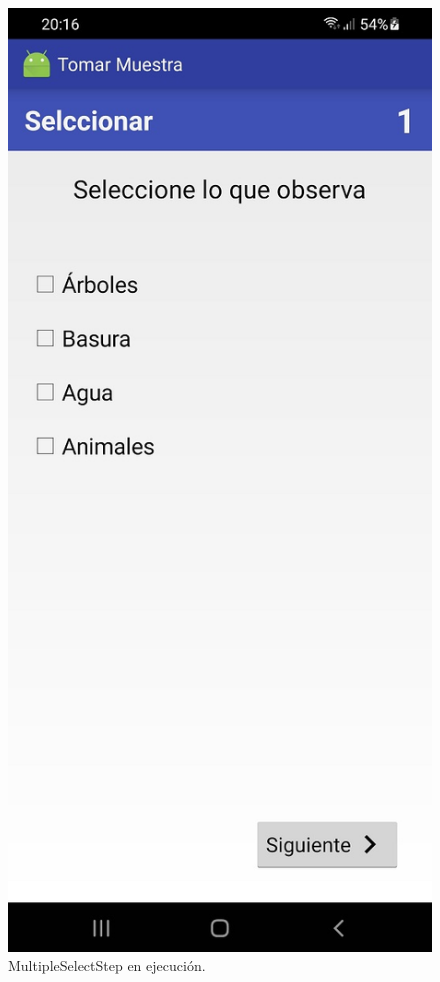 \begin{figure}[H]
  \centering
    \includegraphics[scale=0.3]{50-anexos/C-steps/multiple_select_screen.jpg} 
    \caption{MultipleSelectStep en ejecución.}
\end{figure}


